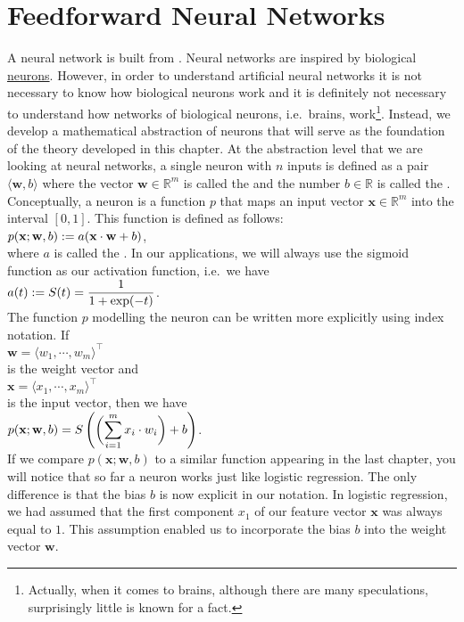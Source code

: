 \section{Feedforward Neural Networks}
A neural network is built from .  Neural networks are inspired by biological 
\href{https://en.wikipedia.org/wiki/Neuron}{neurons}.  However, in order to understand artificial neural
networks it is not necessary to know how biological neurons work and it is definitely not necessary to
understand how networks of biological neurons, i.e.~brains, work\footnote{
  Actually, when it comes to brains, although there are many speculations, surprisingly little is known for a fact.  
}.  
Instead, we develop a mathematical
abstraction of neurons that will serve as the foundation of the theory developed in this chapter.
At the abstraction level that we are looking at neural networks, a single neuron with $n$ inputs is defined as
a pair $\langle \mathbf{w}, b\rangle$ where the 
vector $\mathbf{w} \in \mathbb{R}^m$ is called the  and the number $b \in \mathbb{R}$ is called the .  
Conceptually, a neuron is a function $p$ that maps an input vector $\mathbf{x} \in \mathbb{R}^m$ into the
interval $[0,1]$.  This function is defined as follows:
\\[0.2cm]
\hspace*{1.3cm}
$\displaystyle p(\mathbf{x}; \mathbf{w}, b) := a(\mathbf{x} \cdot \mathbf{w} + b)$,
\\[0.2cm]
where $a$ is called the .  In our applications, we will always use the sigmoid
function as our activation function, i.e.~we have
\\[0.2cm]
\hspace*{1.3cm}
$\displaystyle a(t) := S(t) = \frac{1}{1 + \exp(-t)}$.
\\[0.2cm]
The function $p$ modelling the neuron can be written more explicitly using index notation.  If
\\[0.2cm]
\hspace*{1.3cm}
$\mathbf{w} = \langle w_1, \cdots, w_m \rangle^\top$ 
\\[0.2cm]
is the weight vector and 
\\[0.2cm]
\hspace*{1.3cm}
$\mathbf{x} = \langle x_1, \cdots, x_m \rangle^\top$
\\[0.2cm]
is the input vector, then we have
\\[0.2cm]
\hspace*{1.3cm}
$\displaystyle p(\mathbf{x}; \mathbf{w}, b) = S\left(\biggl(\sum\limits_{i=1}^m x_i \cdot w_i\biggr) + b\right)$.
\\[0.2cm]
If we compare $p(\mathbf{x}; \mathbf{w}, b)$ 
to a similar function appearing in the last chapter, you will notice 
that so far a neuron works just like logistic regression.  The only difference is that the bias $b$
is now explicit in our notation.  In logistic regression, we had assumed that the first component $x_1$ of our
feature vector $\mathbf{x}$ was always equal to $1$.  This assumption enabled us to incorporate the bias $b$ into the
weight vector $\mathbf{w}$.

